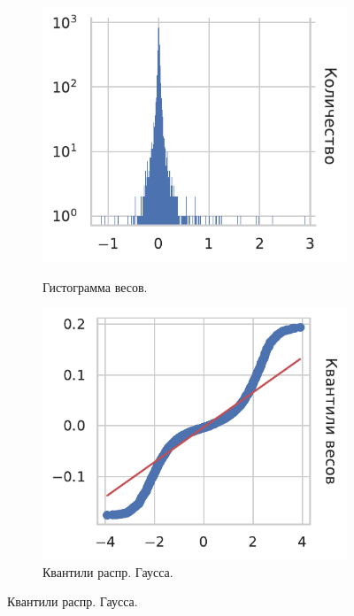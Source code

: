 \documentclass[12pt]{extarticle}
\begin{document}
\begin{figure}[!htb]
     \caption{Распределение весов обученной модели.}
     \centering
     \begin{subfigure}[t]{0.3\linewidth}
        \centering
        \caption{Гистограмма весов.}
        \includegraphics[width=1\linewidth]{pics/weights_distribution.pdf}
        \label{fig:weights_distribution}
     \end{subfigure}
     \begin{subfigure}[t]{0.3\linewidth}
        \centering
        \caption{Квантили распр. Гаусса.}
        \includegraphics[width=1\linewidth]{pics/weights_norm.pdf}

\end{subfigure}
\end{figure}
\end{document}
